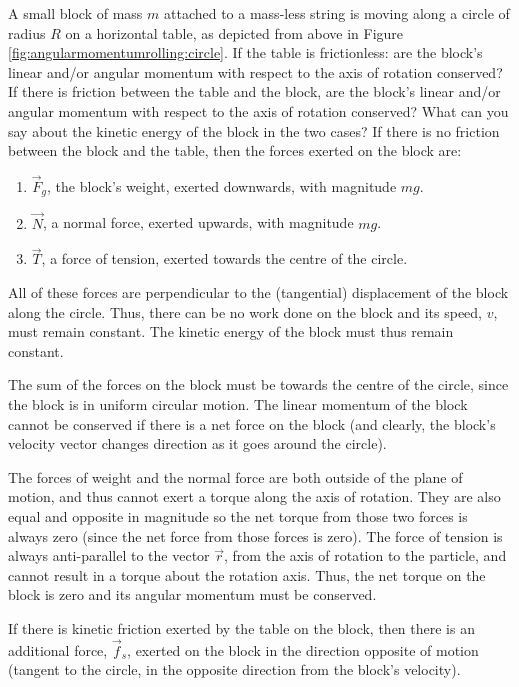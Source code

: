 \begin{example}{
A small block of mass $m$ attached to a mass-less string is moving along a circle of radius $R$ on a horizontal table, as depicted from above in Figure \ref{fig:angularmomentumrolling:circle}. If the table is frictionless: are the block's linear and/or angular momentum with respect to the axis of rotation conserved? If there is friction between the table and the block, are the block's linear and/or angular momentum with respect to the axis of rotation conserved? What can you say about the kinetic energy of the block in the two cases?}
If there is no friction between the block and the table, then the forces exerted on the block are:
\begin{enumerate}
\item $\vec F_g$, the block's weight, exerted downwards, with magnitude $mg$.
\item $\vec N$, a normal force, exerted upwards, with magnitude $mg$.
\item $\vec T$, a force of tension, exerted towards the centre of the circle.
\end{enumerate}
All of these forces are perpendicular to the (tangential) displacement of the block along the circle. Thus, there can be no work done on the block and its speed, $v$, must remain constant. The kinetic energy of the block must thus remain constant.

The sum of the forces on the block must be towards the centre of the circle, since the block is in uniform circular motion. The linear momentum of the block cannot be conserved if there is a net force on the block (and clearly, the block's velocity vector changes direction as it goes around the circle). 

The forces of weight and the normal force are both outside of the plane of motion, and thus cannot exert a torque along the axis of rotation. They are also equal and opposite in magnitude so the net torque from those two forces is always zero (since the net force from those forces is zero). The force of tension is always anti-parallel to the vector $\vec r$, from the axis of rotation to the particle, and cannot result in a torque about the rotation axis. Thus, the net torque on the block is zero and its angular momentum must be conserved. 

If there is kinetic friction exerted by the table on the block, then there is an additional force, $\vec f_s$, exerted on the block in the direction opposite of motion (tangent to the circle, in the opposite direction from the block's velocity). 


\end{example}
